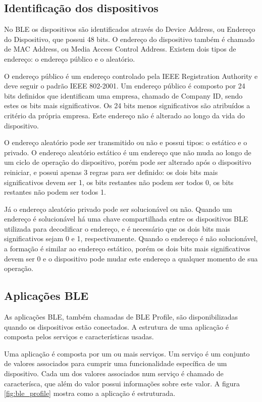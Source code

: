 \subsection{Identificação dos dispositivos}
\label{subsection:id}
No BLE os dispositivos são identificados através do Device Address, ou Endereço
do Dispositivo, que possui 48 bits. O endereço do dispositivo também é chamado
de MAC Address, ou Media Access Control Address. Existem dois tipos de endereço:
o endereço público e o aleatório.\cite{ble4core}

O endereço público é um endereço controlado pela IEEE Registration Authority e
deve seguir o padrão IEEE 802-2001. Um endereço público é composto por 24 bits
definidos que identificam uma empresa, chamado de Company ID, sendo estes os
bits mais significativos. Os 24 bits menos significativos são atribuídos a
critério da própria empresa. Este endereço não é alterado ao longo da vida do
dispositivo.\cite{ble4core}

O endereço aleatório pode ser transmitido ou não e possui tipos: o estático e o
privado. O endereço aleatório estático é um endereço que não muda ao longo de um
ciclo de operação do dispositivo, porém pode ser alterado após o dispositivo
reiniciar, e possui apenas 3 regras para ser definido: os dois bits mais
significativos devem ser 1, os bits restantes não podem ser todos 0, os bits
restantes não podem ser todos 1. \cite{ble4core}

Já o endereço aleatório privado pode ser solucionável ou não. Quando um endereço
é solucionável há uma chave compartilhada entre os dispositivos BLE utilizada
para decodificar o endereço, e é necessário que os dois bits mais significativos
sejam 0 e 1, respectivamente. Quando o endereço é não solucionável, a formação é
similar ao endereço estático, porém os dois bits mais significativos devem ser
0 e o dispositivo pode mudar este endereço a qualquer momento de sua
operação. \cite{ble4core}

\subsection{Aplicações BLE}

As aplicações BLE, também chamadas de BLE Profile, são disponibilizadas quando
os dispositivos estão conectados. A estrutura de uma aplicação é composta pelos
serviços e características usadas.

Uma aplicação é composta por um ou mais serviços. Um serviço é um conjunto de
valores associados para cumprir uma funcionalidade específica de um dispositivo.
Cada um dos valores associados num serviço é chamado de caracterísca, que além
do valor possui informações sobre este valor. A figura \ref{fig:ble_profile}
mostra como a aplicação é estruturada.

